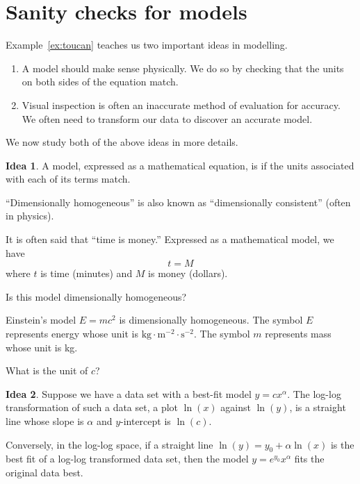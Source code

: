 \documentclass[../main.tex]{subfiles}
\begin{document}
 \section{Sanity checks for models}
Example~\ref{ex:toucan} teaches us two important ideas in modelling.
\begin{enumerate}
  \item A model should make sense physically. We do so by checking that the units on both sides of the equation match.

  \item Visual inspection is often an inaccurate method of evaluation for accuracy. We often need to transform our data to discover an accurate model.
\end{enumerate}

We now study both of the above ideas in more details.

\begin{mdframed}[style=simple]
  \textbf{Idea 1}. A model, expressed as a mathematical equation, is  if the units associated with each of its terms match.
\end{mdframed}
\faPencil*{} ``Dimensionally homogeneous'' is also known as ``dimensionally consistent'' (often in physics).

\begin{example}
  It is often said that ``time is money.'' Expressed as a mathematical model, we have 
  \[
    t = M
  \]
  where \(t\) is time (minutes) and \(M\) is money (dollars).

  Is this model dimensionally homogeneous?
\end{example}

\begin{example}
  Einstein's model \(E = mc^{2}\) is dimensionally homogeneous. The symbol \(E\) represents energy whose unit is \(\text{kg} \cdot \text{m}^{-2} \cdot \text{s}^{-2}\). The symbol \(m\) represents mass whose unit is kg. 

  What is the unit of \(c\)?
\end{example}
\clearpage


\begin{mdframed}[style=simple]
  \textbf{Idea 2}. Suppose we have a data set with a best-fit model \(y = c x^{\alpha}\). 
  The log-log transformation of such a data set, a plot \(\ln(x)\) against \(\ln(y)\), is a straight line whose slope is \(\alpha\) and \(y\)-intercept is \(\ln(c)\).

  Conversely, in the log-log space, if a straight line \(\ln(y) = y_{0} + \alpha \ln(x)\) is the best fit of a log-log transformed data set, then the model \(y = e^{y_{0}} x^{\alpha}\) fits the original data best.
\end{mdframed}
\end{document}

